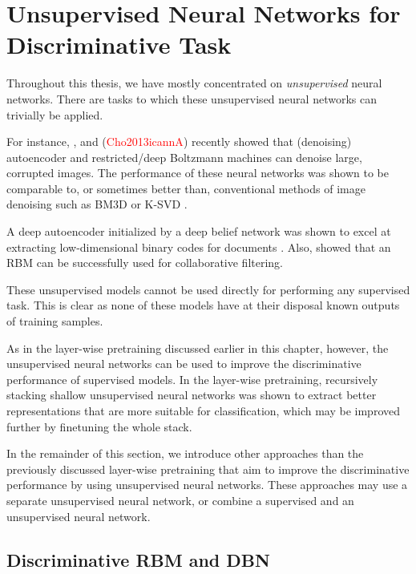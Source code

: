 \documentclass{now}
\newcommand{\alert}[1]{\textcolor{red}{#1}}
\newcommand{\citepub}[1]{\alert{#1}}
\begin{document}
\section{Unsupervised Neural Networks for Discriminative
Task}
\label{sec:dunn}

Throughout this thesis, we have mostly concentrated on
\textit{unsupervised} neural networks.  There are 
tasks to which these unsupervised neural networks can
trivially be applied.

For instance, \citet{Burger2012}, \citet{Xie2012} and
\citet{Cho2013} (\citepub{Cho2013icannA}) 
recently showed
that (denoising) autoencoder and restricted/deep Boltzmann
machines can denoise large, corrupted images.  The
performance of these neural networks was shown to be
comparable to, or sometimes better than, conventional
methods of image denoising such as BM3D \citep{Dabov2007} or
K-SVD \citep{Portilla2003}.  

A deep autoencoder initialized by a deep belief network
was shown to excel at extracting low-dimensional binary
codes for documents \citep{Salakhutdinov2009s}.  Also,
\citet{Salakhutdinov2007} showed that an RBM can be
successfully used for collaborative filtering. 

These unsupervised models cannot be used directly for performing
any supervised task. This is clear as none of these models have
at their disposal known outputs of training samples.

As in the layer-wise pretraining discussed earlier in this
chapter, however, the unsupervised neural networks can be
used to improve the discriminative performance of 
supervised models. In the layer-wise pretraining,
recursively stacking shallow unsupervised neural networks
was shown to extract better representations that are more
suitable for classification, which may be improved further by
finetuning the whole stack.%

In the remainder of this section, we introduce other approaches
than the previously discussed layer-wise pretraining
that aim to improve the discriminative performance by
using unsupervised neural networks. These approaches
may use a separate unsupervised neural network, or combine a
supervised and an unsupervised neural network.

\subsection{Discriminative RBM and DBN}
\label{sec:drbm}
\end{document}
